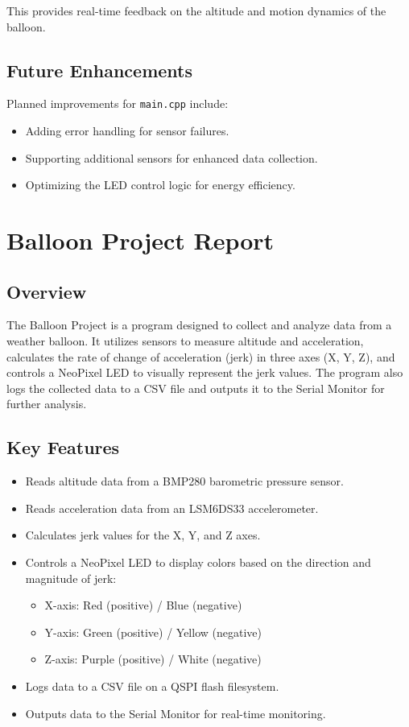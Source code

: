 \documentclass{article}
\begin{document}
This provides real-time feedback on the altitude and motion dynamics of the balloon.

\subsection{Future Enhancements}
Planned improvements for \texttt{main.cpp} include:
\begin{itemize}
    \item Adding error handling for sensor failures.
    \item Supporting additional sensors for enhanced data collection.
    \item Optimizing the LED control logic for energy efficiency.
\end{itemize}

\section{Balloon Project Report}

\subsection{Overview}
The Balloon Project is a program designed to collect and analyze data from a weather balloon. It utilizes sensors to measure altitude and acceleration, calculates the rate of change of acceleration (jerk) in three axes (X, Y, Z), and controls a NeoPixel LED to visually represent the jerk values. The program also logs the collected data to a CSV file and outputs it to the Serial Monitor for further analysis.

\subsection{Key Features}
\begin{itemize}
    \item Reads altitude data from a BMP280 barometric pressure sensor.
    \item Reads acceleration data from an LSM6DS33 accelerometer.
    \item Calculates jerk values for the X, Y, and Z axes.
    \item Controls a NeoPixel LED to display colors based on the direction and magnitude of jerk:
    \begin{itemize}
        \item X-axis: Red (positive) / Blue (negative)
        \item Y-axis: Green (positive) / Yellow (negative)
        \item Z-axis: Purple (positive) / White (negative)
    \end{itemize}
    \item Logs data to a CSV file on a QSPI flash filesystem.
    \item Outputs data to the Serial Monitor for real-time monitoring.
\end{itemize}
\end{document}
